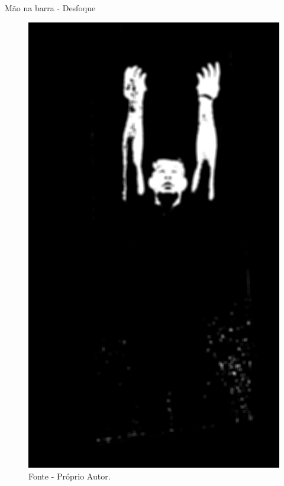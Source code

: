 \begin{frame}{Mão na barra - Desfoque}
    \begin{figure}[!ht]
    \centering
    \includegraphics[scale=0.1]{img/desenvolvimento/maoBarra/blur.png}
    \caption*{Fonte - Próprio Autor.}
    \end{figure}
\end{frame}


